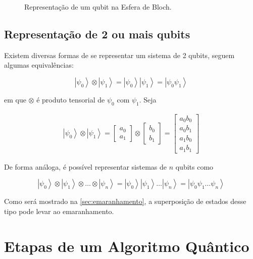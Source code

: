 \begin{figure}[!htp]
    \centering
    
    \caption{Representação de um qubit na Esfera de Bloch.}
    \label{fig:esfera-bloch}
\end{figure}

\subsection{Representação de 2 ou mais qubits}\label{subsec:repr}

Existem diversas formas de se representar um sistema de 2 qubits, seguem
algumas equivalências:

\[\left| \psi_0 \right\rangle \otimes \left| \psi_1 \right\rangle = \left| \psi_0 \right\rangle \left| \psi_1 \right\rangle = \left| \psi_0 \psi_1 \right\rangle\]

em que \(\otimes\) é produto tensorial de \(\psi_0\) com \(\psi_1\).
Seja

\[\begin{aligned}
\left| \psi_0 \right\rangle \otimes \left| \psi_1 \right\rangle
= \begin{bmatrix} a_0 \\ a_1 \end{bmatrix} \otimes \begin{bmatrix} b_0 \\ b_1 \end{bmatrix}
= \begin{bmatrix} a_0 b_0 \\ a_0 b_1 \\ a_1 b_0 \\ a_1 b_1 \end{bmatrix}
\end{aligned}\]

De forma análoga, é possível representar sistemas de \(n\) qubits como

\[\left| \psi_0 \right\rangle \otimes \left| \psi_1 \right\rangle \otimes \dots \otimes \left| \psi_n \right\rangle
= \left| \psi_0 \right\rangle \left| \psi_1 \right\rangle \dots \left| \psi_n \right\rangle
= \left| \psi_0 \psi_1 \dots \psi_n \right\rangle\]

Como será mostrado na \autoref{sec:emaranhamento}, a superposição de estados desse tipo pode levar ao emaranhamento.

\section{Etapas de um Algoritmo Quântico}\label{sec:etapas-quanticas}

